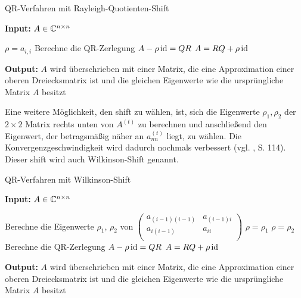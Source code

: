 \documentclass{article}
\theoremstyle{plain}
\begin{document}
\renewcommand{\algorithmicrequire}{\textbf{Input:}}
\renewcommand{\algorithmicensure}{\textbf{Output:}}

\begin{algorithm}

	\caption{QR-Verfahren mit Rayleigh-Quotienten-Shift}
	\label{QR-Verfahren_shifts_rayleigh}
	\algorithmicrequire{ $A \in \mathbb{C}^{n\times n}$}
	\begin{algorithmic}[1]
				\State $\rho = a_{i,i}$
				\State Berechne die QR-Zerlegung $A - \rho \operatorname{id} = QR$
				\State $A = RQ + \rho \operatorname{id}$
			\EndWhile
		\EndFor
	\end{algorithmic}
	\algorithmicensure{ $A$ wird überschrieben mit einer Matrix, die eine Approximation einer oberen Dreiecksmatrix ist und die gleichen Eigenwerte wie die ursprüngliche Matrix $A$ besitzt}
\end{algorithm}

Eine weitere Möglichkeit, den shift zu wählen, ist, sich die Eigenwerte $\rho_1, \rho_2$ der $2 \times 2$ Matrix rechts unten von $A^{(t)}$ zu berechnen und anschließend den Eigenwert, der betragsmäßig näher an $a^{(t)}_{nn}$ liegt, zu wählen. Die Konvergenzgeschwindigkeit wird dadurch nochmals verbessert (vgl. \cite{Num}, S. 114). Dieser shift wird auch Wilkinson-Shift genannt.


\begin{algorithm}[H]
	\label{QR-Verfahren_shifts}
	\caption{QR-Verfahren mit Wilkinson-Shift}
	\algorithmicrequire{ $A \in \mathbb{C}^{n\times n}$}
	\begin{algorithmic}[1]
		\State Berechne die Eigenwerte $\rho_1$, $\rho_2$ von $\left(\begin{array}{rr}
			a_{(i-1)(i-1)}&a_{(i-1)i}\\
			a_{i(i-1)}&a_{ii}\\
		\end{array}\right)$
		\State $\rho = \rho_1$
		\Else
		\State $\rho = \rho_2$
		\EndIf
		\State Berechne die QR-Zerlegung $A - \rho \operatorname{id} = QR$
		\State $A = RQ + \rho \operatorname{id}$
		\EndWhile
		\EndFor
	\end{algorithmic}
	\algorithmicensure{ $A$ wird überschrieben mit einer Matrix, die eine Approximation einer oberen Dreiecksmatrix ist und die gleichen Eigenwerte wie die ursprüngliche Matrix $A$ besitzt}
\end{algorithm}
\end{document}
